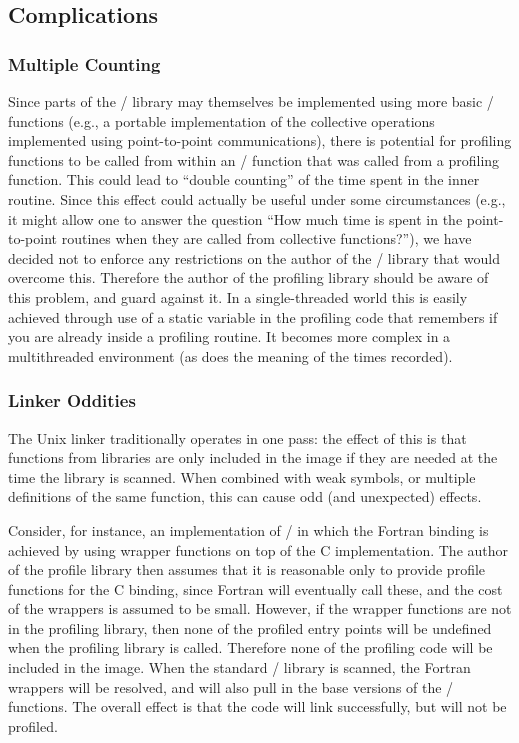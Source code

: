 \subsection{Complications}
\label{sec:prof:complications}

\subsubsection{Multiple Counting}

Since parts of the \MPI/ library may themselves be implemented using more
basic \MPI/ functions (e.g., a portable implementation of the collective
operations implemented using point-to-point communications), there is
potential for profiling functions to be called from within an \MPI/
function that  was called from a profiling function.  This could lead to
``double counting'' of the time spent in the inner routine.  Since this
effect could actually be useful under some circumstances (e.g., it might
allow one to answer the question ``How much time is spent in the
point-to-point routines when they are called from collective functions?''),
we have
decided not to enforce any restrictions on the author of the \MPI/ library
that  would overcome this.  Therefore the author of the profiling library
should be aware of this problem, and guard against it.  In a
single-threaded world this is easily achieved through use of a static
variable in the profiling code that  remembers if you are already inside a
profiling routine.  It becomes more complex in a multithreaded environment
(as does the meaning of the times recorded).

\subsubsection{Linker Oddities}

The Unix linker traditionally operates in one pass: the effect of this is
that functions from libraries are only included in the image if they are
needed at the time the library is scanned.  When combined with weak
symbols, or multiple definitions of the same function, this can cause odd
(and unexpected) effects.

Consider, for instance, an implementation of \MPI/ in which the Fortran
binding is achieved by using wrapper functions on top of the C
implementation.  The author of the profile library then assumes that it is
reasonable only to provide profile functions for the C binding, since
Fortran will eventually call these, and the cost of the wrappers is assumed
to be small.  However, if the wrapper functions are not in the profiling
library, then none of the profiled entry points will be undefined when the
profiling library is called.  Therefore none of the profiling code will be
included in the image.  When the standard \MPI/ library is scanned, the
Fortran wrappers will be resolved, and will also pull in the base versions
of the \MPI/ functions.  The overall effect is that the code will link
successfully, but will not be profiled.

